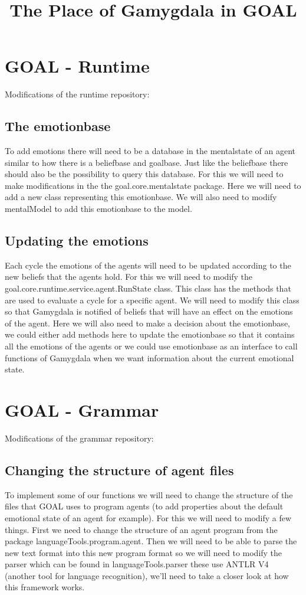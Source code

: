 \documentclass[]{article}
\author{}
\begin{document}
\title{The Place of Gamygdala in GOAL}
\maketitle


\section{GOAL - Runtime}
Modifications of the runtime \cite{GOAL runtime} repository:
\subsection{The emotionbase}
To add emotions there will need to be a database in the \gls{mentalstate} of an agent similar to how there is a \gls{beliefbase} and \gls{goalbase}. Just like the \gls{beliefbase} there should also be the possibility to query this database. For this we will need to make modifications in the the goal.core.mentalstate package. Here we will need to add a new class representing this \gls{emotionbase}. We will also need to modify mentalModel to add this \gls{emotionbase} to the model.

\subsection{Updating the emotions}
Each cycle the emotions of the agents will need to be updated according to the new beliefs that the agents hold. For this we will need to modify the goal.core.runtime.service.agent.RunState class. This class has the methods that are used to evaluate a cycle for a specific agent. We will need to modify this class so that \gls{Gamygdala} is notified of beliefs that will have an effect on the emotions of the agent. Here we will also need to make a decision about the \gls{emotionbase}, we could either add methods here to update the \gls{emotionbase} so that it contains all the emotions of the agents or we could use \gls{emotionbase} as an interface to call functions of \gls{Gamygdala} when we want information about the current emotional state.

\section{GOAL - Grammar}
Modifications of the grammar \cite{GOAL grammar} repository:
\subsection{Changing the structure of agent files}
To implement some of our functions we will need to change the structure of the files that \gls{GOAL} uses to program agents (to add properties about the default emotional state of an agent for example). For this we will need to modify a few things. First we need to change the structure of an agent program from the package languageTools.program.agent. Then we will need to be able to parse the new text format into this new program format so we will need to modify the parser which can be found in languageTools.parser these use \gls{ANTLR} V4 (another tool for language recognition), we'll need to take a closer look at how this framework works.
\end{document}
